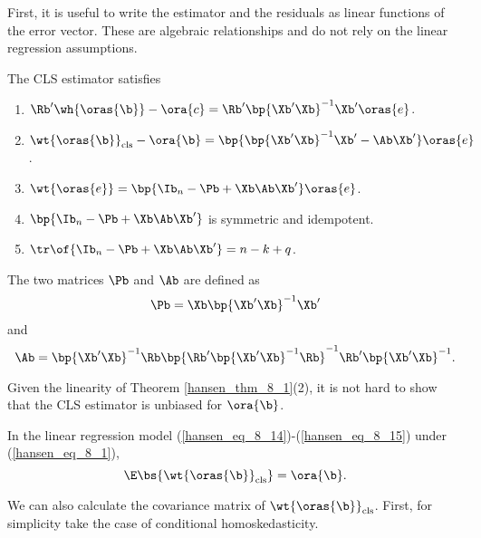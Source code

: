 First, it is useful to write the estimator and the residuals as linear functions of the error vector. These are algebraic relationships and do not rely on the linear regression assumptions.

\begin{theorem}
    \label{hansen_thm_8_1}
    The CLS estimator satisfies 

    \begin{enumerate}[topsep=10pt, leftmargin=20pt, itemsep=0pt, label=(\arabic*)]
        \setlength{\parskip}{10pt} 
        \item $\Rb^{\prime}\wh{\oras{\b}} - \ora{c} = \Rb^{\prime} \bp{\Xb^{\prime} \Xb}^{-1} \Xb^{\prime} \oras{e}$.
        \item $\wt{\oras{\b}}_{\text{cls}} - \ora{\b} = \bp{\bp{\Xb^{\prime} \Xb}^{-1} \Xb^{\prime} - \Ab \Xb^{\prime}} \oras{e}$.
        \item $\wt{\oras{e}} = \bp{\Ib_n - \Pb + \Xb \Ab \Xb^{\prime}} \oras{e}$.
        \item $\bp{\Ib_n - \Pb + \Xb \Ab \Xb^{\prime}}$ is symmetric and idempotent.
        \item $\tr\of{\Ib_n - \Pb + \Xb \Ab \Xb^{\prime}} = n - k + q$.
    \end{enumerate}
    The two matrices $\Pb$ and $\Ab$ are defined as
    \begin{equation}
        \notag 
        \Pb = \Xb \bp{\Xb^{\prime} \Xb}^{-1} \Xb^{\prime}
    \end{equation}
    and 
    \begin{equation}
        \notag 
        \Ab = \bp{\Xb^{\prime} \Xb}^{-1} \Rb \bp{\Rb^{\prime} \bp{\Xb^{\prime} \Xb}^{-1} \Rb}^{-1} \Rb^{\prime} \bp{\Xb^{\prime} \Xb}^{-1}.
    \end{equation}
\end{theorem}

Given the linearity of Theorem \ref{hansen_thm_8_1}(2), it is not hard to show that the CLS estimator is unbiased for $\ora{\b}$.
\begin{theorem}
    \label{hansen_thm_8_2}
    In the linear regression model (\ref{hansen_eq_8_14})-(\ref{hansen_eq_8_15}) under (\ref{hansen_eq_8_1}), 
    \begin{equation}
        \notag 
        \E\bs{\wt{\oras{\b}}_{\text{cls}}} = \ora{\b}.
    \end{equation}
\end{theorem}

We can also calculate the covariance matrix of $\wt{\oras{\b}}_{\text{cls}}$. First, for simplicity take the case of conditional homoskedasticity.

